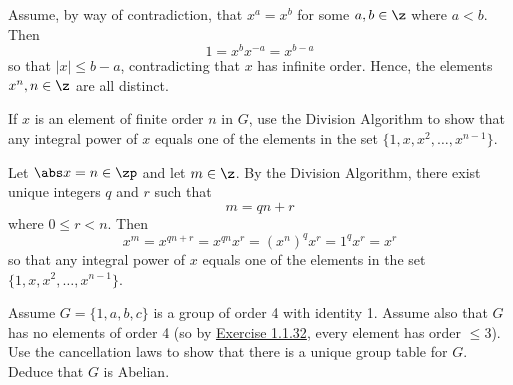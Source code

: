 \begin{sol}
    Assume, by way of contradiction, that $x^a = x^b$ for some $a, b \in \z$ where $a < b$. Then
    \[1 = x^b x^{-a} = x^{b - a}\]
    so that $|x| \leq b - a$, contradicting that $x$ has infinite order. Hence, the elements $x^n, n \in \z$ are all distinct.
\end{sol}

\begin{exercise} \label{ex1.1.35}
    If $x$ is an element of finite order $n$ in $G$, use the Division Algorithm to show that any integral power of $x$ equals one of the elements in the set $\{1, x, x^2, \dots, x^{n-1}\}$.
    
\end{exercise}

\begin{sol}
    Let $\abs x = n \in \zp$ and let $m \in \z$. By the Division Algorithm, there exist unique integers $q$ and $r$ such that
    \[m = qn + r\]
    where $0 \leq r < n$. Then
    \[x^m = x^{qn + r} = x^{qn} x^r = (x^n)^q x^r = 1^q x^r = x^r\]
    so that any integral power of $x$ equals one of the elements in the set $\{1, x, x^2, \dots, x^{n-1}\}$.
\end{sol}

\begin{specialexercise} \label{ex1.1.36} 
    Assume $G = \{1, a, b, c\}$ is a group of order 4 with identity 1. Assume also that $G$ has no elements of order 4 (so by \hyperref[ex1.1.32]{Exercise 1.1.32}, every element has order $\leq 3$). Use the cancellation laws to show that there is a unique group table for $G$. Deduce that $G$ is Abelian.
\end{specialexercise}

